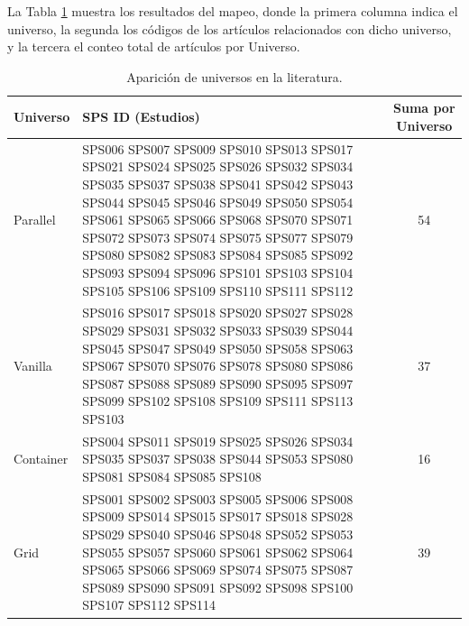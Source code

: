 La Tabla \ref{tab:aparicion_universos} muestra los resultados del mapeo, donde la primera columna indica el universo, la segunda los códigos de los artículos relacionados con dicho universo, y la tercera el conteo total de artículos por Universo.

\begin{table}[H]
	\centering
	\renewcommand{\arraystretch}{1.2} %
	\fontsize{9pt}{10pt}\selectfont %
	\caption{Aparición de universos en la literatura.}
	\label{tab:aparicion_universos}
	\begin{tabular}{|l|p{8cm}|c|}
		\hline
		\textbf{Universo} & \textbf{SPS ID (Estudios)}                                                                                                                                                                                                                                                                                                                                                                       & \textbf{Suma por Universo} \\
		\hline
		Parallel          & \tiny{SPS006 SPS007 SPS009 SPS010 SPS013 SPS017 SPS021 SPS024 SPS025 SPS026 SPS032 SPS034 SPS035 SPS037 SPS038 SPS041 SPS042 SPS043 SPS044 SPS045 SPS046 SPS049 SPS050 SPS054 SPS061 SPS065 SPS066 SPS068 SPS070 SPS071 SPS072 SPS073 SPS074 SPS075 SPS077 SPS079 SPS080 SPS082 SPS083 SPS084 SPS085 SPS092 SPS093 SPS094 SPS096 SPS101 SPS103 SPS104 SPS105 SPS106 SPS109 SPS110 SPS111 SPS112} & 54                         \\
		\hline
		Vanilla           & \tiny{SPS016 SPS017 SPS018 SPS020 SPS027 SPS028 SPS029 SPS031 SPS032 SPS033 SPS039 SPS044 SPS045 SPS047 SPS049 SPS050 SPS058 SPS063 SPS067 SPS070 SPS076 SPS078 SPS080 SPS086 SPS087 SPS088 SPS089 SPS090 SPS095 SPS097 SPS099 SPS102 SPS108 SPS109 SPS111 SPS113 SPS103}                                                                                                                        & 37                         \\
		\hline
		Container         & \tiny{SPS004 SPS011 SPS019 SPS025 SPS026 SPS034 SPS035 SPS037 SPS038 SPS044 SPS053 SPS080 SPS081 SPS084 SPS085 SPS108}                                                                                                                                                                                                                                                                           & 16                         \\
		\hline
		Grid              & \tiny{SPS001 SPS002 SPS003 SPS005 SPS006 SPS008 SPS009 SPS014 SPS015 SPS017 SPS018 SPS028 SPS029 SPS040 SPS046 SPS048 SPS052 SPS053 SPS055 SPS057 SPS060 SPS061 SPS062 SPS064 SPS065 SPS066 SPS069 SPS074 SPS075 SPS087 SPS089 SPS090 SPS091 SPS092 SPS098 SPS100 SPS107 SPS112 SPS114}                                                                                                          & 39                         \\

\end{tabular}
\end{table}
